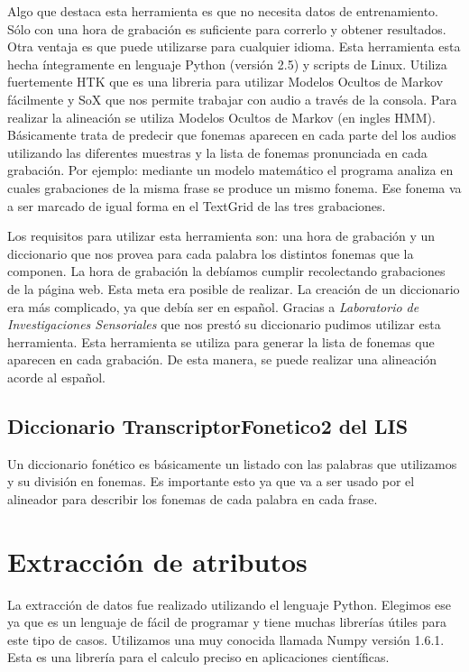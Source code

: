 Algo que destaca esta herramienta es que no necesita datos de entrenamiento. Sólo con una hora de grabación es suficiente para correrlo y obtener resultados. Otra ventaja es que puede utilizarse para cualquier idioma. Esta herramienta esta hecha íntegramente en lenguaje Python (versión 2.5) y scripts de Linux. Utiliza fuertemente HTK que es una libreria para utilizar Modelos Ocultos de Markov fácilmente y SoX que nos permite trabajar con audio a través de la consola. Para realizar la alineación se utiliza Modelos Ocultos de Markov \cite{rabiner} (en ingles HMM). Básicamente trata de predecir que fonemas aparecen en cada parte del los audios utilizando las diferentes muestras y la lista de fonemas pronunciada en cada grabación. Por ejemplo: mediante un modelo matemático el programa analiza en cuales grabaciones de la misma frase se produce un mismo fonema. Ese fonema va a ser marcado de igual forma en el TextGrid de las tres grabaciones.

Los requisitos para utilizar esta herramienta son: una hora de grabación y un diccionario que nos provea para cada palabra los distintos fonemas que la componen. La hora de grabación la debíamos cumplir recolectando grabaciones de la página web. Esta meta era posible de realizar. La creación de un diccionario era más complicado, ya que debía ser en español. Gracias a \textit{Laboratorio de Investigaciones Sensoriales} que nos prestó su diccionario pudimos utilizar esta herramienta. Esta herramienta se utiliza para generar la lista de fonemas que aparecen en cada grabación. De esta manera, se puede realizar una alineación acorde al español.

\subsection{Diccionario TranscriptorFonetico2 del LIS}

Un diccionario fonético es básicamente un listado con las palabras que utilizamos y su división en fonemas. Es importante esto ya que va a ser usado por el alineador para describir los fonemas de cada palabra en cada frase.

\section{Extracción de atributos}

La extracción de datos fue realizado utilizando el lenguaje Python. Elegimos ese ya que es un lenguaje de fácil de programar y tiene muchas librerías útiles para este tipo de casos. Utilizamos una muy conocida llamada Numpy versión 1.6.1. Esta es una librería para el calculo preciso en aplicaciones científicas.

